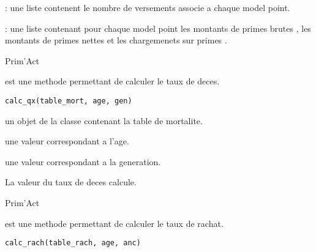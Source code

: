 \documentclass[a4paper]{book}
\begin{document}
%
\begin{Value}
 : une liste contenent le nombre de versements  associe a chaque model point.

 : une liste contenant pour chaque model point les montants de primes brutes ,
les montants de primes nettes  et les chargemenets sur primes .
\end{Value}
%
\begin{Author}\relax
Prim'Act
\end{Author}
%
\begin{Description}\relax
{} est une methode permettant de calculer le taux de deces.
\end{Description}
%
\begin{Usage}
\begin{verbatim}
calc_qx(table_mort, age, gen)
\end{verbatim}
\end{Usage}
%
\begin{Arguments}
\begin{ldescription}
\item[\code{table\_mort}] un objet de la classe  contenant la table de mortalite.

\item[\code{age}] une valeur  correspondant a l'age.

\item[\code{gen}] une valeur  correspondant a la generation.
\end{ldescription}
\end{Arguments}
%
\begin{Value}
La valeur du taux de deces calcule.
\end{Value}
%
\begin{Author}\relax
Prim'Act
\end{Author}
%
\begin{Description}\relax
{} est une methode permettant de calculer le taux de rachat.
\end{Description}
%
\begin{Usage}
\begin{verbatim}
calc_rach(table_rach, age, anc)
\end{verbatim}
\end{Usage}
\end{document}
